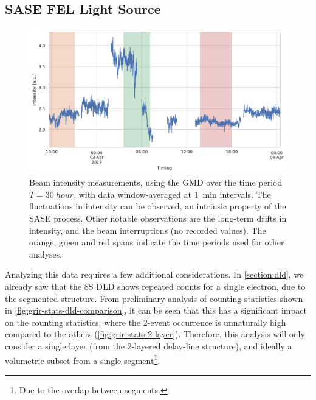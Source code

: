 \subsection{SASE FEL Light Source}
\begin{figure}
    \centering
    \includegraphics[width=0.8\linewidth]{images/gmd_grir.pdf}
    \caption{Beam intensity measurements, using the \gls{GMD} over the time period $T=\qty{30}{hour}$, with data window-averaged at \qty{1}{min} intervals. The fluctuations in intensity can be observed, an intrinsic property of the \gls{SASE} process. Other notable observations are the long-term drifts in intensity, and the beam interruptions (no recorded values). The orange, green and red spans indicate the time periods used for other analyses.}
    \label{fig:gmd-intensity}
\end{figure}

Analyzing this data requires a few additional considerations. In \cref{section:dld}, we already saw that the \num{8}S \gls{DLD} shows repeated counts for a single electron, due to the segmented structure. From preliminary analysis of counting statistics shown in \cref{fig:grir-stats-dld-comparison}, it can be seen that this has a significant impact on the counting statistics, where the \num{2}-event occurrence is unnaturally high compared to the others (\cref{fig:grir-stats-2-layer}). Therefore, this analysis will only consider a single layer (from the 2-layered delay-line structure), and ideally a volumetric subset from a single segment\footnote{Due to the overlap between segments.}.


